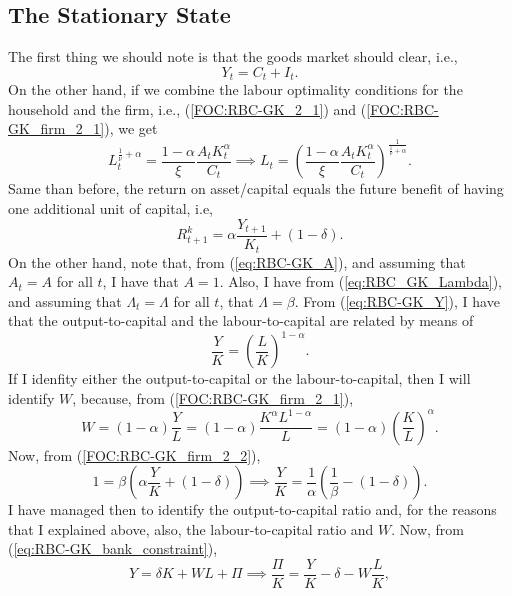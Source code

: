 \documentclass{article}
\begin{document}
	\subsection{The Stationary State}
	The first thing we should note is that the goods market should clear, i.e.,
	\begin{equation}
		Y_t = C_t + I_t.
	\end{equation}
	On the other hand, if we combine the labour optimality conditions for the household and the firm, i.e., (\ref{FOC:RBC-GK_2_1}) and (\ref{FOC:RBC-GK_firm_2_1}), we get
	\begin{equation}
		L_t^{\frac{1}{\nu}+\alpha} = \frac{1-\alpha}{\xi}\frac{A_tK_t^\alpha}{C_t} \implies L_t =  \left(\frac{1-\alpha}{\xi}\frac{A_tK_t^\alpha}{C_t}\right)^{\frac{1}{\frac{1}{\nu}+\alpha}}.
	\end{equation}
	Same than before, the return on asset/capital equals the future benefit of having one additional unit of capital, i.e,
	\begin{equation}
		R_{t+1}^k = \alpha \frac{Y_{t+1}}{K_{t}} + (1-\delta).
	\end{equation}
	On the other hand, note that, from (\ref{eq:RBC-GK_A}), and assuming that $A_t = A$ for all $t$, I have that $A = 1$. Also, I have from (\ref{eq:RBC_GK_Lambda}), and assuming that $\Lambda_t = \Lambda$ for all $t$, that $\Lambda = \beta$. From (\ref{eq:RBC-GK_Y}), I have that the output-to-capital and the labour-to-capital are related by means of
	\begin{equation}
		\frac{Y}{K} = \left(\frac{L}{K}\right)^{1-\alpha}.
	\end{equation}
	If I idenfity either the output-to-capital or the labour-to-capital, then I will identify $W$, because, from (\ref{FOC:RBC-GK_firm_2_1}),
	\begin{equation}
		W = (1-\alpha)\frac{Y}{L} = (1-\alpha)\frac{K^\alpha L^{1-\alpha}}{L} = (1-\alpha) \left(\frac{K}{L}\right)^{\alpha}.
	\end{equation}
	Now, from (\ref{FOC:RBC-GK_firm_2_2}),
		\begin{equation}
			 1= \beta\left(\alpha\frac{Y}{K}+(1-\delta)\right) \implies \frac{Y}{K} = \frac{1}{\alpha}\left(\frac{1}{\beta} - (1-\delta)\right).
		\end{equation}
	I have managed then to identify the output-to-capital ratio and, for the reasons that I explained above, also, the labour-to-capital ratio and $W$. Now, from (\ref{eq:RBC-GK_bank_constraint}),
	\begin{equation}
		Y = \delta K + WL + \Pi \implies \frac{\Pi}{K} = \frac{Y}{K} - \delta - W\frac{L}{K},
	\end{equation}
\end{document}
